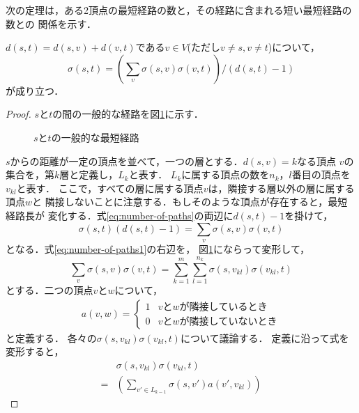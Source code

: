 次の定理は，ある2頂点の最短経路の数と，その経路に含まれる短い最短経路の数との
関係を示す．
\begin{theorem}
  \label{thm:number-of-paths}
  $d(s,t)=d(s,v)+d(v,t)$である$v\in V$(ただし$v\neq s,v\neq t$)について，
  \begin{equation}
    \label{eq:number-of-paths}
    \sigma(s,t)=\left(
    \sum_{v}\sigma(s,v)\sigma(v,t)\right) / (d(s,t)-1)
  \end{equation}
  が成り立つ．
\end{theorem}
\begin{proof}
  $s$と$t$の間の一般的な経路を図\ref{fig:proof-number-of-paths}に示す．
  \begin{figure}
    \centering
    \def\svgwidth{.5\columnwidth}
    
    \caption{$s$と$t$の一般的な最短経路}
    \label{fig:proof-number-of-paths}
  \end{figure}
  $s$からの距離が一定の頂点を並べて，一つの層とする．$d(s,v)=k$なる頂点
  $v$の集合を，第$k$層と定義し，$L_k$と表す．
  $L_k$に属する頂点の数を$n_k$，$l$番目の頂点を$v_{kl}$と表す．
  ここで，すべての層に属する頂点$v$は，隣接する層以外の層に属する頂点$w$と
  隣接しないことに注意する．もしそのような頂点が存在すると，最短経路長が
  変化する．式\ref{eq:number-of-paths}の両辺に$d(s,t)-1$を掛けて，
  \begin{equation}
    \sigma(s,t)(d(s,t)-1)=\sum_{v}\sigma(s,v)\sigma(v,t)
    \label{eq:number-of-paths1}
  \end{equation}
  となる．式\ref{eq:number-of-paths1}の右辺を，
  図\ref{fig:proof-number-of-paths}にならって変形して，
  \begin{equation}
    \sum_{v}\sigma(s,v)\sigma(v,t)=
    \sum_{k=1}^m\sum_{l=1}^{n_k}\sigma(s,v_{kl})\sigma(v_{kl},t)
    \label{eq:number-of-paths2}
  \end{equation}
  とする．二つの頂点$v$と$w$について，
  \begin{align*}
    a(v,w)=
    \begin{cases}
      1 & vとwが隣接しているとき \\
      0 & vとwが隣接していないとき
    \end{cases}
  \end{align*}
  と定義する．
  各々の$\sigma(s,v_{kl})\sigma(v_{kl},t)$について議論する．
  定義に沿って式を変形すると，
  \begin{align}
    &\sigma(s,v_{kl})\sigma(v_{kl},t)\nonumber\\
    =&\left(\sum_{v'\in L_{k-1}}\sigma(s,v')a(v',v_{kl})\right)

\end{align}
\end{proof}
